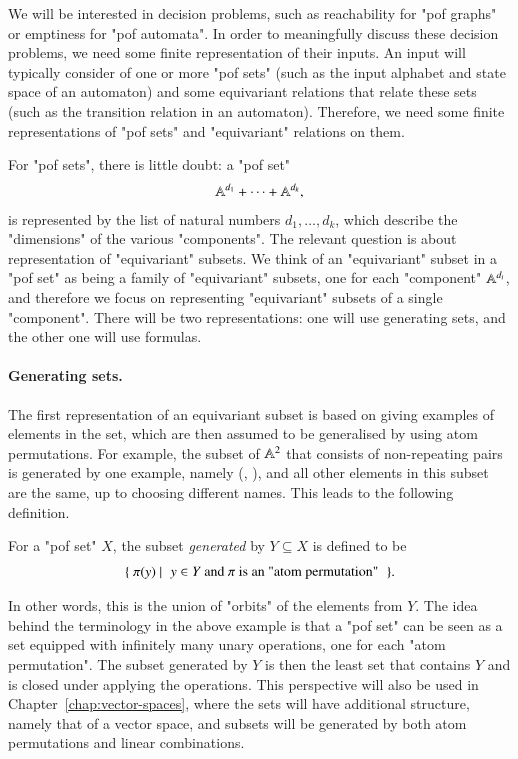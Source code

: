 We will be interested in decision problems, such as reachability for  "pof graphs" or emptiness for "pof automata". 
In order to meaningfully discuss these decision problems, we need   some finite representation of their inputs. An input will typically consider of one or more "pof sets" (such as the input alphabet and state space of an automaton) and some equivariant relations that relate these sets (such as the transition relation in an automaton). Therefore, we need some finite representations of "pof sets" and "equivariant" relations on them. 

For "pof sets", there is little doubt: a "pof set" 
\begin{align*}
\mathbb A^{d_1} + \cdots + \mathbb A^{d_k},
\end{align*}
is represented by the list of natural numbers $d_1,\ldots,d_k$, which describe the "dimensions" of the various "components". The relevant question is about representation of "equivariant" subsets. We think of an "equivariant" subset in a "pof set" as being a family of "equivariant" subsets, one for each "component" $\mathbb A^{d_i}$, and therefore we focus on representing "equivariant" subsets of a single "component". There will be two representations: one will use generating sets, and the other one will use formulas. 

\paragraph*{Generating sets.} 
\label{sec:generating-sets}
The first representation of an equivariant subset is based on giving examples of elements in the set, which are then assumed to be generalised by using atom permutations. For example, the subset of $\mathbb A^2$ that consists of non-repeating pairs is generated by one example, namely (\john, \eve), and all other elements in this subset are the same, up to choosing different names. This leads to the following definition.

\begin{definition}\label{def:generated-subset}
    For a "pof set" $X$, the subset  \emph{generated} by  $Y \subseteq X$ is defined to be 
\begin{align*}
\setbuild{ \pi(y)}{$y \in Y$ and $\pi$ is an "atom permutation"}.
\end{align*}
\end{definition}

In other words, this is the union of "orbits" of the elements from $Y$. The idea behind the terminology in the above example is that a "pof set" can be seen as a set equipped with infinitely many unary operations,  one for each "atom permutation". The subset generated by $Y$ is then the  least set that contains $Y$ and is closed under applying the operations. This perspective will also be used in Chapter~\ref{chap:vector-spaces}, where the sets will have additional structure, namely that of a vector space, and subsets will be generated by both atom permutations and linear combinations. 

